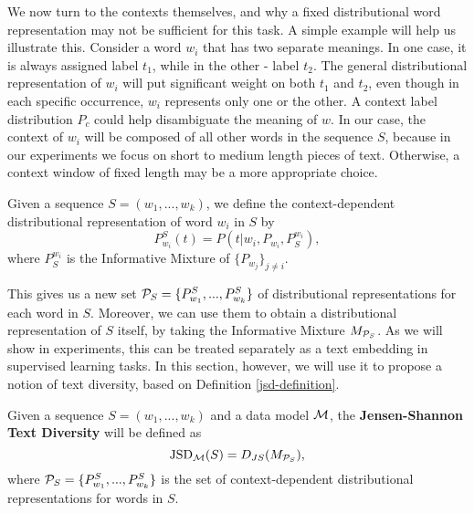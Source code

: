 We now turn to the contexts themselves, and why a fixed distributional
word representation may not be sufficient for this task. A simple example will
help us illustrate this. Consider a word $w_i$ that has
two separate meanings. In one case, it is always assigned label $t_1$,
while in the other - label $t_2$. The general distributional
representation of $w_i$ will put significant weight on both $t_1$ and
$t_2$, even though in each specific occurrence, $w_i$ represents only one
or the other. A context label distribution $P_c$ could help disambiguate
the meaning of $w$. In our case, the context of $w_i$ will be composed of
all other words in the sequence $S$, because in our experiments we
focus on short to medium length pieces of text. Otherwise, a context
window of fixed length may be a more appropriate choice.

\bed
Given a sequence $S=(w_1,...,w_k)$, we define the context-dependent
distributional representation of word $w_i$ in $S$ by 
\[P_{w_i}^S(t) = P(t|w_i,P_{w_i},P_S^{w_i}),\]
where $P_S^{w_i}$ is the Informative Mixture of $\{P_{w_j}\}_{j\neq i}$.
\eed

This gives us a new set ${\mathcal P}_S=\{P_{w_1}^S,...,P_{w_k}^S\}$ of
distributional representations for each word in $S$. Moreover, we can
use them to obtain a distributional representation of $S$ itself, by
taking the Informative Mixture $M_{{\mathcal P}_S}$. As we will show in
experiments, this can be treated separately as a text embedding in
supervised learning tasks. In this section, however, we will use it to
propose a notion of text diversity, based on Definition
\ref{jsd-definition}. 

\bed
Given a sequence $S=(w_1,...,w_k)$ and a data model ${\mathcal M}$, the
{\bf Jensen-Shannon Text Diversity} will be defined as
\[\textrm{JSD}_{{\mathcal M}}(S) = D_{JS}(M_{{\mathcal P}_S}),\] where ${\mathcal P}_S=\{P_{w_1}^S,...,P_{w_k}^S\}$ is the set
of context-dependent distributional representations for words in $S$. 
\eed



